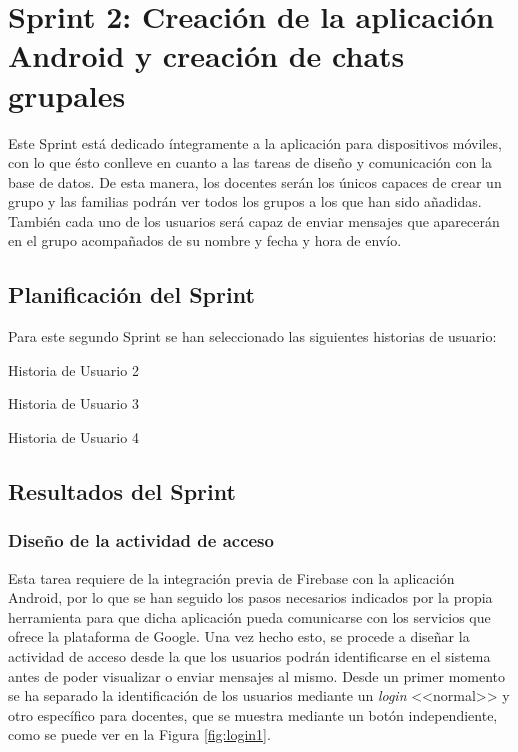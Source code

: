 \section{Sprint 2: Creación de la aplicación Android y creación de chats grupales}
Este Sprint está dedicado íntegramente a la aplicación para dispositivos móviles, con lo que ésto conlleve en cuanto a las tareas de diseño y comunicación con la base de datos. De esta manera, los docentes serán los únicos capaces de crear un grupo y las familias podrán ver todos los grupos a los que han sido añadidas. También cada uno de los usuarios será capaz de enviar mensajes que aparecerán en el grupo acompañados de su nombre y fecha y hora de envío.

\newpage

\subsection{Planificación del Sprint}
Para este segundo Sprint se han seleccionado las siguientes historias de usuario:

\begin{table}[hp]
	\centering
	{\small
		
	}
	\caption[Historia de Usuario 2]
	{Historia de Usuario 2}
	\label{tab:historia2}
\end{table}

\begin{table}[hp]
	\centering
	{\small
		
	}
	\caption[Historia de Usuario 3]
	{Historia de Usuario 3}
	\label{tab:historia3}
\end{table}

\begin{table}[hp]
	\centering
	{\small
		
	}
	\caption[Historia de Usuario 4]
	{Historia de Usuario 4}
	\label{tab:historia4}
\end{table}

\newpage

\subsection{Resultados del Sprint}
\subsubsection{Diseño de la actividad de acceso}
Esta tarea requiere de la integración previa de Firebase con la aplicación Android, por lo que se han seguido los pasos necesarios indicados por la propia herramienta para que dicha aplicación pueda comunicarse con los servicios que ofrece la plataforma de Google. Una vez hecho esto, se procede a diseñar la actividad de acceso desde la que los usuarios podrán identificarse en el sistema antes de poder visualizar o enviar mensajes al mismo. Desde un primer momento se ha separado la identificación de los usuarios mediante un \textit{login} <<normal>> y otro específico para docentes, que se muestra mediante un botón independiente, como se puede ver en la Figura \ref{fig:login1}.

